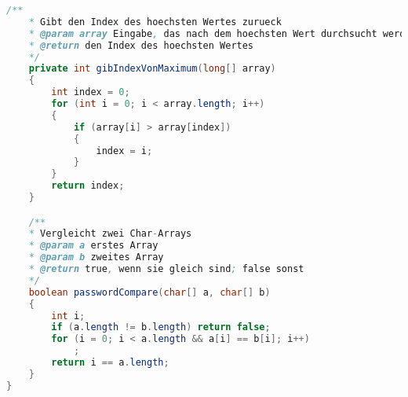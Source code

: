 \documentclass{article}
\begin{document}
\begin{lstlisting}[language=Java]
	/**
 	* Gibt den Index des hoechsten Wertes zurueck
 	* @param array Eingabe, das nach dem hoechsten Wert durchsucht werden soll
 	* @return den Index des hoechsten Wertes
 	*/
	private int gibIndexVonMaximum(long[] array)
	{
    	int index = 0;
    	for (int i = 0; i < array.length; i++)
    	{
        	if (array[i] > array[index])
        	{
            	index = i;
        	}
    	}
    	return index;
	}

	/**
 	* Vergleicht zwei Char-Arrays
 	* @param a erstes Array
 	* @param b zweites Array
 	* @return true, wenn sie gleich sind; false sonst
 	*/
	boolean passwordCompare(char[] a, char[] b)
	{
    	int i;
    	if (a.length != b.length) return false;
    	for (i = 0; i < a.length && a[i] == b[i]; i++)
        	;
    	return i == a.length;
	}
}
\end{lstlisting}
\end{document}
